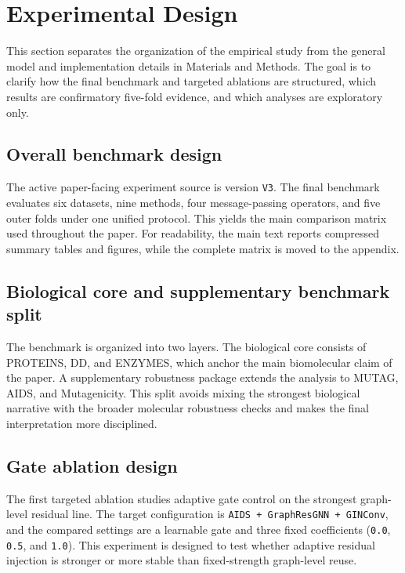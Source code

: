 \section*{Experimental Design}

This section separates the organization of the empirical study from the general model and implementation details in Materials and Methods. The goal is to clarify how the final benchmark and targeted ablations are structured, which results are confirmatory five-fold evidence, and which analyses are exploratory only.

\subsection*{Overall benchmark design}

The active paper-facing experiment source is version \texttt{V3}. The final benchmark evaluates six datasets, nine methods, four message-passing operators, and five outer folds under one unified protocol. This yields the main comparison matrix used throughout the paper. For readability, the main text reports compressed summary tables and figures, while the complete matrix is moved to the appendix.

\subsection*{Biological core and supplementary benchmark split}

The benchmark is organized into two layers. The biological core consists of PROTEINS, DD, and ENZYMES, which anchor the main biomolecular claim of the paper. A supplementary robustness package extends the analysis to MUTAG, AIDS, and Mutagenicity. This split avoids mixing the strongest biological narrative with the broader molecular robustness checks and makes the final interpretation more disciplined.

\subsection*{Gate ablation design}

The first targeted ablation studies adaptive gate control on the strongest graph-level residual line. The target configuration is \texttt{AIDS + GraphResGNN + GINConv}, and the compared settings are a learnable gate and three fixed coefficients (\texttt{0.0}, \texttt{0.5}, and \texttt{1.0}). This experiment is designed to test whether adaptive residual injection is stronger or more stable than fixed-strength graph-level reuse.

